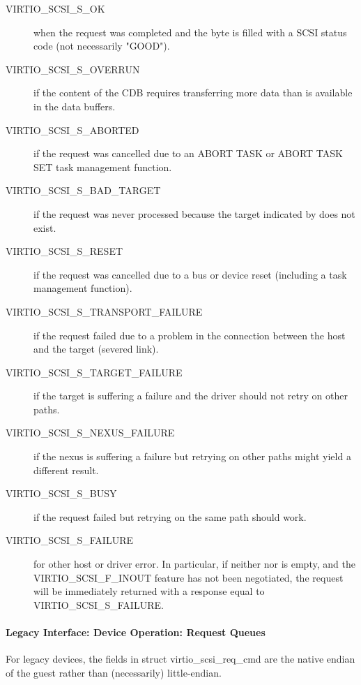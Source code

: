 \begin{description}

\item[VIRTIO_SCSI_S_OK] when the request was completed and the 
  byte is filled with a SCSI status code (not necessarily
  "GOOD").

\item[VIRTIO_SCSI_S_OVERRUN] if the content of the CDB requires
  transferring more data than is available in the data buffers.

\item[VIRTIO_SCSI_S_ABORTED] if the request was cancelled due to an
  ABORT TASK or ABORT TASK SET task management function.

\item[VIRTIO_SCSI_S_BAD_TARGET] if the request was never processed
  because the target indicated by  does not exist.

\item[VIRTIO_SCSI_S_RESET] if the request was cancelled due to a bus
  or device reset (including a task management function).

\item[VIRTIO_SCSI_S_TRANSPORT_FAILURE] if the request failed due to a
  problem in the connection between the host and the target
  (severed link).

\item[VIRTIO_SCSI_S_TARGET_FAILURE] if the target is suffering a
  failure and the driver should not retry on other paths.

\item[VIRTIO_SCSI_S_NEXUS_FAILURE] if the nexus is suffering a failure
  but retrying on other paths might yield a different result.

\item[VIRTIO_SCSI_S_BUSY] if the request failed but retrying on the
  same path should work.

\item[VIRTIO_SCSI_S_FAILURE] for other host or driver error. In
  particular, if neither  nor  is empty, and the
  VIRTIO_SCSI_F_INOUT feature has not been negotiated, the
  request will be immediately returned with a response equal to
  VIRTIO_SCSI_S_FAILURE.
\end{description}

\paragraph{Legacy Interface: Device Operation: Request Queues}\label{sec:Device Types / SCSI Host Device / Device Operation / Device Operation: Request Queues / Legacy Interface: Device Operation: Request Queues}
For legacy devices, the fields in struct virtio_scsi_req_cmd are the
native endian of the guest rather than (necessarily) little-endian.

